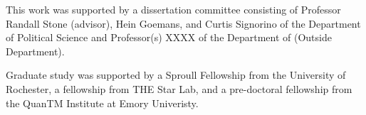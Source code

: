 This work was supported by a dissertation committee consisting of
Professor Randall Stone (advisor),
Hein Goemans, and Curtis Signorino of the Department of Political Science
and Professor(s) XXXX of the Department of (Outside Department).

Graduate study was supported by a Sproull Fellowship from the University of Rochester,
a fellowship from THE Star Lab,
and a pre-doctoral fellowship from the QuanTM Institute at Emory Univeristy.
